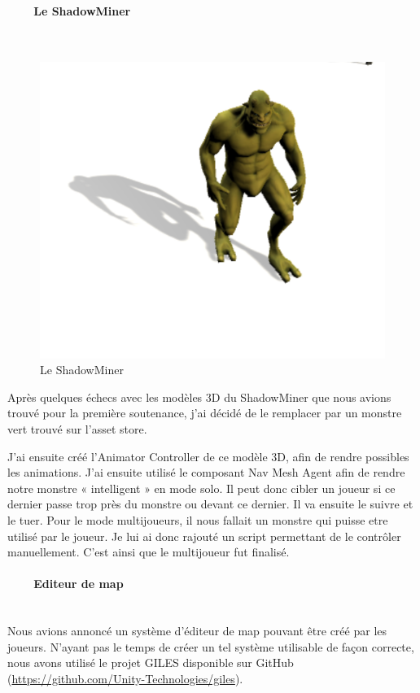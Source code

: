 \documentclass[titlepage, 13px, a4paper]{report}
\begin{document}
\paragraph{\\ \\ \\~~~~Le ShadowMiner} \hspace{0pt} \\
\begin{figure}[h!]
  \centering
  \includegraphics[scale=0.5]{images/cedric_shadowminer.png}
  \caption{Le ShadowMiner}
\end{figure}
Après quelques échecs avec les modèles 3D du ShadowMiner que nous avions trouvé pour la première soutenance, 
j’ai décidé de le remplacer par un monstre vert trouvé sur l’asset store.

J’ai ensuite créé l’Animator Controller de ce modèle 3D, afin de rendre possibles les animations.
J’ai ensuite utilisé le composant Nav Mesh Agent afin de rendre notre monstre « intelligent » en mode solo.
Il peut donc cibler un joueur si ce dernier passe trop près du monstre ou devant ce dernier. Il va ensuite le suivre et le tuer.
Pour le mode multijoueurs, il nous fallait un monstre qui puisse etre utilisé par le joueur.
Je lui ai donc rajouté un script permettant de le contrôler manuellement.
C’est ainsi que le multijoueur fut finalisé. \\


\paragraph{~~~~Editeur de map} \hspace{0pt} \\
Nous avions annoncé un système d’éditeur de map pouvant être créé par les joueurs.
N’ayant pas le temps de créer un tel système utilisable de façon correcte, nous avons utilisé le projet GILES 
disponible sur GitHub (\url{https://github.com/Unity-Technologies/giles}).
\end{document}
